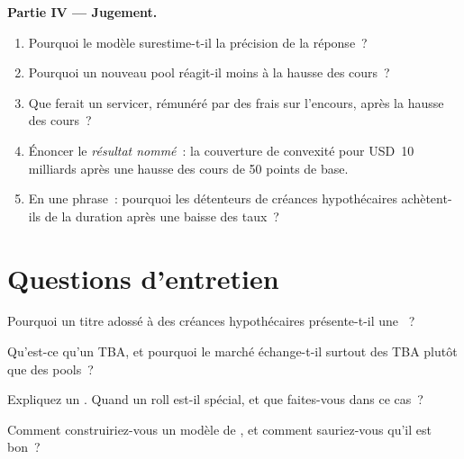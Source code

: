 \begin{problem}
\medskip\noindent\textbf{Partie IV --- Jugement.}
\begin{enumerate}[resume]
\item Pourquoi le modèle surestime-t-il la précision de la réponse~?
\item Pourquoi un nouveau pool réagit-il moins à la hausse des cours~?
\item Que ferait un servicer, rémunéré par des frais sur l'encours, après la hausse des cours~?
\item Énoncer le \emph{résultat nommé}~: la couverture de convexité pour USD~10 milliards
après une hausse des cours de 50 points de base.
\item En une phrase~: pourquoi les détenteurs de créances hypothécaires achètent-ils de la duration après une baisse des taux~?
\end{enumerate}
\end{problem}

\section{Questions d'entretien}

\begin{interviewq}\label{iq:m2:mortgages-and-agencies:1}
Pourquoi un titre adossé à des créances hypothécaires présente-t-il une ~?
\end{interviewq}

\begin{interviewq}\label{iq:m2:mortgages-and-agencies:2}
Qu'est-ce qu'un TBA, et pourquoi le marché échange-t-il surtout des TBA plutôt que des pools~?
\end{interviewq}

\begin{interviewq}\label{iq:m2:mortgages-and-agencies:3}
Expliquez un . Quand un roll est-il spécial, et que faites-vous dans ce cas~?
\end{interviewq}

\begin{interviewq}\label{iq:m2:mortgages-and-agencies:4}
Comment construiriez-vous un modèle de , et comment sauriez-vous qu'il est bon~?
\end{interviewq}

